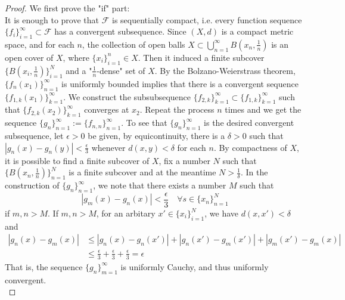 \documentclass[11pt,english]{smfart}
\newcommand{\mc}{\mathcal}
\begin{document}
\begin{proof} We first prove the "if" part:\\
    It is enough to prove that $\mc{F}$ is sequentially compact, i.e. every function sequence $\{f_i\}_{i=1}^\infty \subset \mc{F}$ has a convergent subsequence. Since $(X,d)$ is a compact metric space, and for each $n$, the collection of open balls $X \subset \bigcup_{n=1}^\infty B(x_n,\frac{1}{n})$ is an open cover of $X$, where $\{x_i\}_{i=1}^n \in X$. Then it induced a finite subcover $\{B(x_i,\frac{1}{n})\}_{i=1}^{N}$ and a "$\frac{1}{n}$-dense" set of $X$.  By the Bolzano-Weierstrass theorem, $\{f_{n}(x_1)\}_{n=1}^\infty$ is uniformly bounded implies that there is a convergent sequence $\{f_{1,k}(x_1)\}_{k=1}^\infty$. We construct the subsubsequence $\{f_{2,k}\}_{k=1}^\infty \subset \{f_{1,k}\}_{k=1}^\infty$ such that $\{f_{2,k}(x_2)\}_{k=1}^\infty$ converges at $x_2$. Repeat the process $n$ times and we get the sequence $\{g_n\}_{n=1}^\infty := \{f_{n,n}\}_{n=1}^\infty$. To see that $\{g_n\}_{n=1}^\infty$ is the desired convergent subsequence, let $\epsilon > 0$ be given, by equicontinuity, there is a $\delta > 0$ such that $|g_n(x) - g_n(y)| < \frac{\epsilon}{3}$ whenever $d(x,y) < \delta$ for each $n$. By compactness of $X$, it is possible to find a finite subcover of $X$, fix a number $N$ such that $\{B(x_n,\frac{1}{n})\}_{n=1}^N$ is a finite subcover and at the meantime $N > \frac{1}{\delta}$. In the construction of $\{g_n\}_{n=1}^\infty$, we note that there exists a number $M$ such that $$|g_m(x) - g_n(x)| < \frac{\epsilon}{3} \quad \forall s \in \{x_n\}_{n=1}^N$$
    if $m,n > M$. If $m,n > M$, for an arbitary $x' \in \{x_i\}_{i=1}^N$, we have $d(x,x') < \delta $ and 
    \begin{align*}
        |g_n(x) - g_m(x)| &\leq |g_n(x) - g_n(x')| + |g_n(x') - g_m(x')| + |g_m(x') - g_m(x)| \\
        &\leq \frac{\epsilon}{3} + \frac{\epsilon}{3} + \frac{\epsilon}{3} = \epsilon
    \end{align*}
    That is, the sequence $\{g_n\}_{m=1}^\infty$ is uniformly Cauchy, and thus uniformly convergent.\\


\end{proof}
\end{document}
